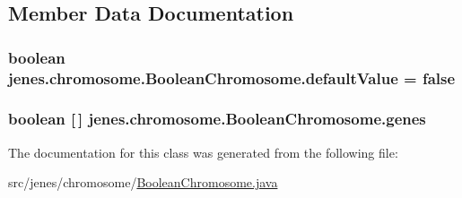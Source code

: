 \subsection{Member Data Documentation}
\hypertarget{classjenes_1_1chromosome_1_1_boolean_chromosome_aa91a13c17d9a481a3ec56cc4ac9a1fd0}{
\subsubsection[{default\-Value}]{\setlength{\rightskip}{0pt plus 5cm}boolean jenes.\-chromosome.\-Boolean\-Chromosome.\-default\-Value = false\hspace{0.3cm}{\ttfamily [private]}}}\label{classjenes_1_1chromosome_1_1_boolean_chromosome_aa91a13c17d9a481a3ec56cc4ac9a1fd0}
\hypertarget{classjenes_1_1chromosome_1_1_boolean_chromosome_a87f2b8bb4dea33263178bc16a1dceeae}{
\subsubsection[{genes}]{\setlength{\rightskip}{0pt plus 5cm}boolean \mbox{[}$\,$\mbox{]} jenes.\-chromosome.\-Boolean\-Chromosome.\-genes\hspace{0.3cm}{\ttfamily [private]}}}\label{classjenes_1_1chromosome_1_1_boolean_chromosome_a87f2b8bb4dea33263178bc16a1dceeae}


The documentation for this class was generated from the following file\-:\begin{DoxyCompactItemize}
\item 
src/jenes/chromosome/\hyperlink{_boolean_chromosome_8java}{Boolean\-Chromosome.\-java}\end{DoxyCompactItemize}
